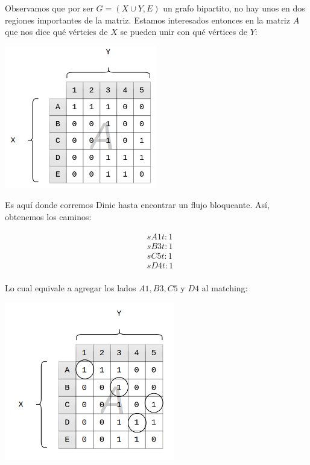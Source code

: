 \documentclass[10pt,a4paper]{article}
\begin{document}
Observamos que por ser $G = (X \cup Y, E)$ un grafo bipartito, no hay unos en dos regiones importantes de la matriz. Estamos interesados entonces en la matriz $A$ que nos dice qué vértcies de $X$ se pueden unir con qué vértices de $Y$:

\begin{center}

    \begin{adjustbox}{max size={\textwidth}{\textheight}}
        \includegraphics{definitions/matching_6.jpg}
        \end{adjustbox}
    
\end{center}

Es aquí donde corremos Dinic hasta encontrar un flujo bloqueante. Así, obtenemos los caminos:

\begin{center}
\begin{align*} &sA1t:1\\ &sB3t:1\\ &sC5t:1\\ &sD4t:1\\ \end{align*}
\end{center}

Lo cual equivale a agregar los lados $A1, B3, C5$ y $D4$ al matching:

\begin{center}

    \begin{adjustbox}{max size={\textwidth}{\textheight}}
        \includegraphics{definitions/matching_7.jpg}
        \end{adjustbox}
    
\end{center}
\end{document}
